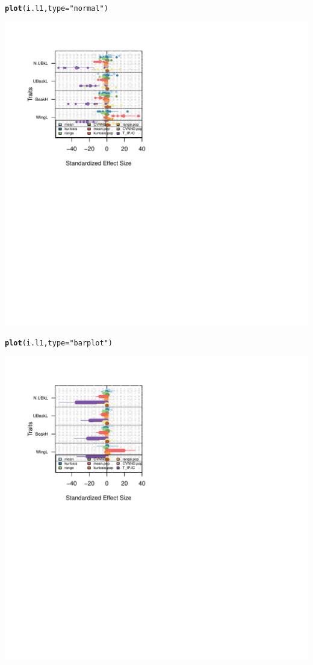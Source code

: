 \documentclass[12pt]{article}\usepackage[]{graphicx}\usepackage[]{color}
\makeatletter
\def\maxwidth{ %
  \ifdim\Gin@nat@width>\linewidth
    \linewidth
  \else
    \Gin@nat@width
  \fi
}
\newcommand{\hlstr}[1]{\textcolor[rgb]{0.192,0.494,0.8}{#1}}%
\newcommand{\hlstd}[1]{\textcolor[rgb]{0.345,0.345,0.345}{#1}}%
\newcommand{\hlkwc}[1]{\textcolor[rgb]{0.333,0.667,0.333}{#1}}%
\newcommand{\hlkwd}[1]{\textcolor[rgb]{0.737,0.353,0.396}{\textbf{#1}}}%
\newenvironment{kframe}{%
 \def\at@end@of@kframe{}%
 \ifinner\ifhmode%
  \def\at@end@of@kframe{\end{minipage}}%
  \begin{minipage}{\columnwidth}%
 \fi\fi%
 \def\FrameCommand##1{\hskip\@totalleftmargin \hskip-\fboxsep
 \colorbox{shadecolor}{##1}\hskip-\fboxsep
     \hskip-\linewidth \hskip-\@totalleftmargin \hskip\columnwidth}%
 \MakeFramed {\advance\hsize-\width
   \@totalleftmargin\z@ \linewidth\hsize
   \@setminipage}}%
 {\par\unskip\endMakeFramed%
 \at@end@of@kframe}
\newenvironment{knitrout}{}{} %
\makeatother
\begin{document}
\begin{knitrout}
\begin{kframe}\begin{alltt}
\hlkwd{plot}\hlstd{(i.l1,}\hlkwc{type} \hlstd{=} \hlstr{"normal"}\hlstd{)}
\end{alltt}
\end{kframe}
\includegraphics[width=\maxwidth]{figure/unnamed-chunk-503} 
\begin{kframe}\begin{alltt}
\hlkwd{plot}\hlstd{(i.l1,}\hlkwc{type} \hlstd{=} \hlstr{"barplot"}\hlstd{)}
\end{alltt}
\end{kframe}
\includegraphics[width=\maxwidth]{figure/unnamed-chunk-504} 

\end{knitrout}
\end{document}
